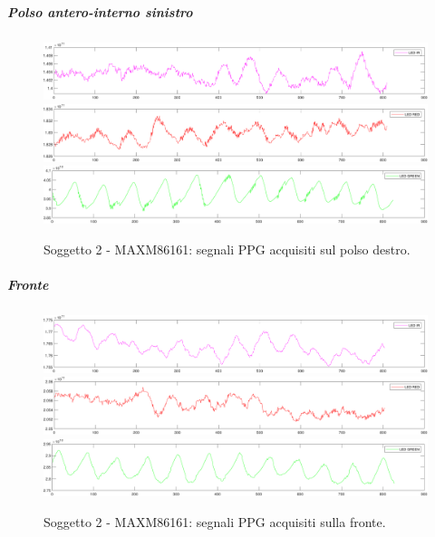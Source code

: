 \subparagraph{Polso antero-interno sinistro}
\begin{figure}[h]
	\centering
	\includegraphics[width=1\linewidth]{ImageFiles/Misure Preliminari/Soggetto 2/maxm86161/polso_inferiore_ir_moving_avg}
	\includegraphics[width=1\linewidth]{ImageFiles/Misure Preliminari/Soggetto 2/maxm86161/polso_inferiore_red_moving_avg}
	\includegraphics[width=1\linewidth]{ImageFiles/Misure Preliminari/Soggetto 2/maxm86161/polso_inferiore_green_moving_avg}
	\caption{Soggetto 2 - MAXM86161: segnali PPG acquisiti sul polso destro.}
	\label{fig:soggetto2_MAXM86161_polso}
\end{figure}

\subparagraph{Fronte}

\begin{figure}[h]
	\centering
	\includegraphics[width=1\linewidth]{ImageFiles/Misure Preliminari/Soggetto 2/maxm86161/fronte_ir_moving_avg}
	\includegraphics[width=1\linewidth]{ImageFiles/Misure Preliminari/Soggetto 2/maxm86161/fronte_red_moving_avg}
	\includegraphics[width=1\linewidth]{ImageFiles/Misure Preliminari/Soggetto 2/maxm86161/fronte_green_moving_avg}
	\caption{Soggetto 2 - MAXM86161: segnali PPG acquisiti sulla fronte.}
	\label{fig:soggetto2_MAXM86161_fronte}
\end{figure}


\clearpage